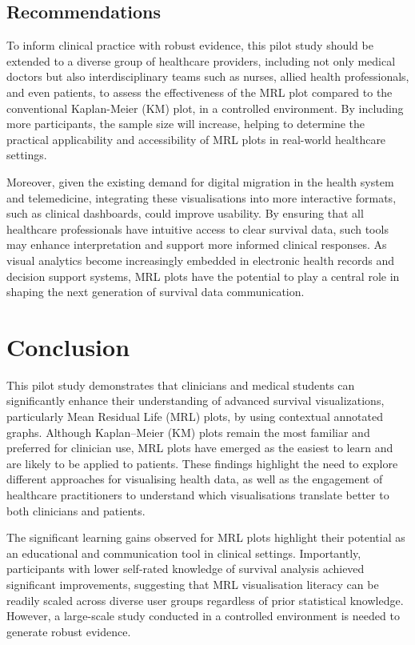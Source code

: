 \documentclass[
  onecolumn]{article}
\begin{document}
\subsection{Recommendations}\label{recommendations}

To inform clinical practice with robust evidence, this pilot study
should be extended to a diverse group of healthcare providers, including
not only medical doctors but also interdisciplinary teams such as
nurses, allied health professionals, and even patients, to assess the
effectiveness of the MRL plot compared to the conventional Kaplan-Meier
(KM) plot, in a controlled environment. By including more participants,
the sample size will increase, helping to determine the practical
applicability and accessibility of MRL plots in real-world healthcare
settings.

Moreover, given the existing demand for digital migration in the health
system and telemedicine, integrating these visualisations into more
interactive formats, such as clinical dashboards, could improve
usability. By ensuring that all healthcare professionals have intuitive
access to clear survival data, such tools may enhance interpretation and
support more informed clinical responses. As visual analytics become
increasingly embedded in electronic health records and decision support
systems, MRL plots have the potential to play a central role in shaping
the next generation of survival data communication.

\section{Conclusion}\label{conclusion}

This pilot study demonstrates that clinicians and medical students can
significantly enhance their understanding of advanced survival
visualizations, particularly Mean Residual Life (MRL) plots, by using
contextual annotated graphs. Although Kaplan--Meier (KM) plots remain
the most familiar and preferred for clinician use, MRL plots have
emerged as the easiest to learn and are likely to be applied to
patients. These findings highlight the need to explore different
approaches for visualising health data, as well as the engagement of
healthcare practitioners to understand which visualisations translate
better to both clinicians and patients.

The significant learning gains observed for MRL plots highlight their
potential as an educational and communication tool in clinical settings.
Importantly, participants with lower self-rated knowledge of survival
analysis achieved significant improvements, suggesting that MRL
visualisation literacy can be readily scaled across diverse user groups
regardless of prior statistical knowledge. However, a large-scale study
conducted in a controlled environment is needed to generate robust
evidence.
\end{document}
